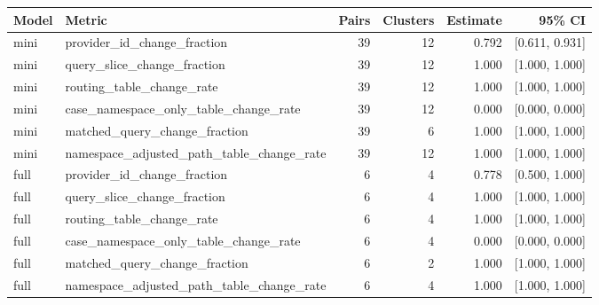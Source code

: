 \begin{tabular}{llrrrr}
Model & Metric & Pairs & Clusters & Estimate & 95\% CI \\
\hline
mini & provider\_id\_change\_fraction & 39 & 12 & 0.792 & [0.611, 0.931] \\
mini & query\_slice\_change\_fraction & 39 & 12 & 1.000 & [1.000, 1.000] \\
mini & routing\_table\_change\_rate & 39 & 12 & 1.000 & [1.000, 1.000] \\
mini & case\_namespace\_only\_table\_change\_rate & 39 & 12 & 0.000 & [0.000, 0.000] \\
mini & matched\_query\_change\_fraction & 39 & 6 & 1.000 & [1.000, 1.000] \\
mini & namespace\_adjusted\_path\_table\_change\_rate & 39 & 12 & 1.000 & [1.000, 1.000] \\
full & provider\_id\_change\_fraction & 6 & 4 & 0.778 & [0.500, 1.000] \\
full & query\_slice\_change\_fraction & 6 & 4 & 1.000 & [1.000, 1.000] \\
full & routing\_table\_change\_rate & 6 & 4 & 1.000 & [1.000, 1.000] \\
full & case\_namespace\_only\_table\_change\_rate & 6 & 4 & 0.000 & [0.000, 0.000] \\
full & matched\_query\_change\_fraction & 6 & 2 & 1.000 & [1.000, 1.000] \\
full & namespace\_adjusted\_path\_table\_change\_rate & 6 & 4 & 1.000 & [1.000, 1.000] \\
\end{tabular}
